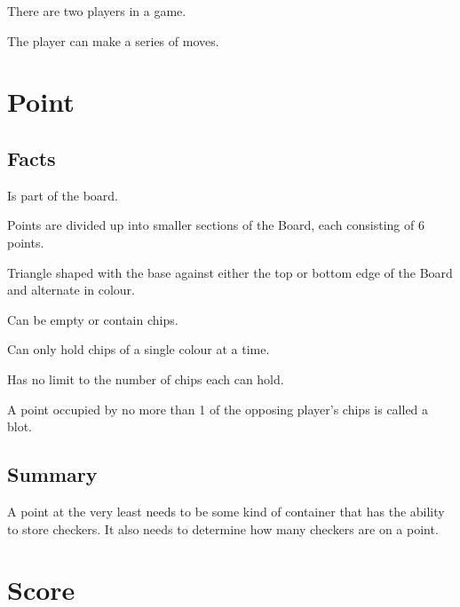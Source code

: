 \documentclass{report}
\begin{document}
\begin{dashed}
    \item There are two players in a game.
    \item The player can make a series of moves.
\end{dashed}

\section{Point}

\subsection{Facts}

\begin{dashed}
    \item Is part of the board.
    \item Points are divided up into smaller sections of the Board, each consisting of 6 points.
    \item Triangle shaped with the base against either the top or bottom edge of the Board and alternate in colour.
    \item Can be empty or contain chips.
    \item Can only hold chips of a single colour at a time.
    \item Has no limit to the number of chips each can hold.
    \item A point occupied by no more than 1 of the opposing player’s chips is called a blot.
\end{dashed}


\subsection{Summary}

A point at the very least needs to be some kind of container that has the ability
to store checkers. It also needs to determine how many checkers are on a point.

\section{Score}
\end{document}
